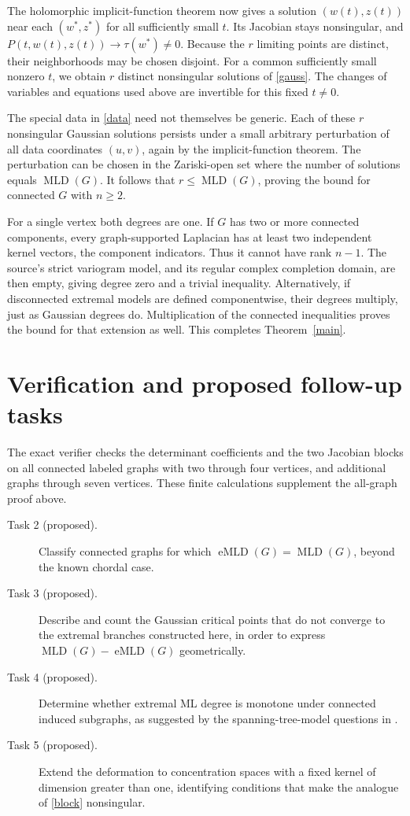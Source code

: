 \documentclass[11pt]{article}
\newcommand{\MLD}{\operatorname{MLD}}
\newcommand{\eMLD}{\operatorname{eMLD}}
\begin{document}
The holomorphic implicit-function theorem now gives a solution
$(w(t),z(t))$ near each $(w^*,z^*)$ for all sufficiently small $t$.
Its Jacobian stays nonsingular, and
$P(t,w(t),z(t))\to\tau(w^*)\ne0$. Because the $r$ limiting points are
distinct, their neighborhoods may be chosen disjoint. For a common
sufficiently small nonzero $t$, we obtain $r$ distinct nonsingular
solutions of \eqref{gauss}. The changes of variables and equations
used above are invertible for this fixed $t\ne0$.

The special data in \eqref{data} need not themselves be generic.
Each of these $r$ nonsingular Gaussian solutions persists under a small
arbitrary perturbation of all data coordinates $(u,v)$, again by the
implicit-function theorem. The perturbation can be chosen in the
Zariski-open set where the number of solutions equals $\MLD(G)$.
It follows that $r\leq\MLD(G)$, proving the bound for connected
$G$ with $n\geq2$.

For a single vertex both degrees are one. If $G$ has two or more
connected components, every graph-supported Laplacian has at least two
independent kernel vectors, the component indicators. Thus it cannot
have rank $n-1$. The source's strict variogram model, and its regular
complex completion domain, are then empty, giving degree zero and a
trivial inequality. Alternatively, if disconnected extremal models are
defined componentwise, their degrees multiply, just as Gaussian degrees
do. Multiplication of the connected inequalities proves the bound for
that extension as well. This completes Theorem~\ref{main}.

\section*{Verification and proposed follow-up tasks}
The exact verifier checks the determinant coefficients and the two
Jacobian blocks on all connected labeled graphs with two through four
vertices, and additional graphs through seven vertices. These finite
calculations supplement the all-graph proof above.
\begin{description}
\item[Task 2 (proposed).] Classify connected graphs for which
$\eMLD(G)=\MLD(G)$, beyond the known chordal case.
\item[Task 3 (proposed).] Describe and count the Gaussian critical points
that do not converge to the extremal branches constructed here, in order
to express $\MLD(G)-\eMLD(G)$ geometrically.
\item[Task 4 (proposed).] Determine whether extremal ML degree is
monotone under connected induced subgraphs, as suggested by the
spanning-tree-model questions in \cite{CMS}.
\item[Task 5 (proposed).] Extend the deformation to concentration
spaces with a fixed kernel of dimension greater than one, identifying
conditions that make the analogue of \eqref{block} nonsingular.
\end{description}
\end{document}
